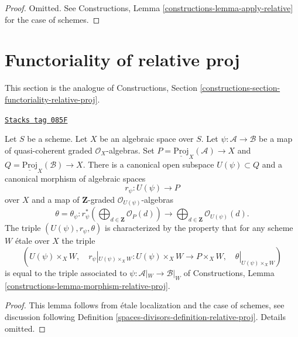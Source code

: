 \begin{proof}
Omitted.
See Constructions, Lemma \ref{constructions-lemma-apply-relative}
for the case of schemes.
\end{proof}

\section{Functoriality of relative proj}
\label{spaces-divisors-section-functoriality-relative-proj}
This section is the analogue of
Constructions, Section \ref{constructions-section-functoriality-relative-proj}.

\begin{lemma}
\label{spaces-divisors-lemma-morphism-relative-proj}
\href{https://stacks.math.columbia.edu/tag/085F}{\texttt{Stacks tag 085F}}

Let $S$ be a scheme. Let $X$ be an algebraic space over $S$.
Let $\psi : \mathcal{A} \to \mathcal{B}$ be a map of
quasi-coherent graded $\mathcal{O}_X$-algebras. Set
$P = \underline{\text{Proj}}_X(\mathcal{A}) \to X$ and
$Q = \underline{\text{Proj}}_X(\mathcal{B}) \to X$.
There is a canonical open subspace
$U(\psi) \subset Q$ and a canonical morphism of
algebraic spaces
$$
r_\psi :
U(\psi)
\longrightarrow
P
$$
over $X$ and a map of $\mathbf{Z}$-graded $\mathcal{O}_{U(\psi)}$-algebras
$$
\theta = \theta_\psi :
r_\psi^*\left(
\bigoplus\nolimits_{d \in \mathbf{Z}} \mathcal{O}_P(d)
\right)
\longrightarrow
\bigoplus\nolimits_{d \in \mathbf{Z}} \mathcal{O}_{U(\psi)}(d).
$$
The triple $(U(\psi), r_\psi, \theta)$ is characterized by the property
that for any scheme $W$ \'etale over $X$ the triple
$$
(U(\psi) \times_X W,\quad
r_\psi|_{U(\psi) \times_X W} : U(\psi) \times_X W \to  P \times_X W,\quad
\theta|_{U(\psi) \times_X W})
$$
is equal to the triple associated to $\psi : \mathcal{A}|_W \to \mathcal{B}|_W$
of Constructions, Lemma \ref{constructions-lemma-morphism-relative-proj}.
\end{lemma}

\begin{proof}
This lemma follows from \'etale localization and the case of schemes, see
discussion following
Definition \ref{spaces-divisors-definition-relative-proj}. Details omitted.
\end{proof}

